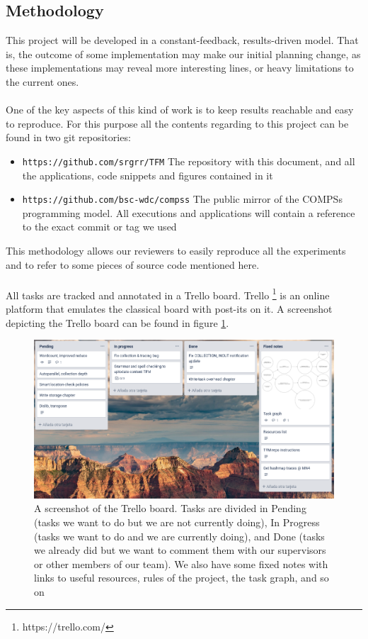 \subsection{Methodology}

This project will be developed in a constant-feedback, results-driven model. That is, the outcome of some implementation may make our initial planning change, as these implementations may reveal more interesting lines, or heavy limitations to the current ones.\\
\\
One of the key aspects of this kind of work is to keep results reachable and easy to reproduce. For this purpose all the contents regarding to this project can be found in two git repositories:
\begin{itemize}
\item \verb|https://github.com/srgrr/TFM| The repository with this document, and all the applications, code snippets and figures contained in it
\item \verb|https://github.com/bsc-wdc/compss| The public mirror of the COMPSs programming model. All executions and applications will contain a reference to the exact commit or tag we used
\end{itemize}
This methodology allows our reviewers to easily reproduce all the experiments and to refer to some pieces of source code mentioned here.\\
\\
All tasks are tracked and annotated in a Trello board. Trello \footnote{https://trello.com/} is an online platform that emulates the classical board with post-its on it. A screenshot depicting the Trello board can be found in figure \ref{fig:trello}.

\begin{figure}
\centering
\includegraphics[scale = 0.5]{figures/trello.png}
\caption{A screenshot of the Trello board. Tasks are divided in Pending (tasks we want to do but we are not currently doing), In Progress (tasks we want to do and we are currently doing), and Done (tasks we already did but we want to comment them with our supervisors or other members of our team). We also have some fixed notes with links to useful resources, rules of the project, the task graph, and so on}
\label{fig:trello}
\end{figure}